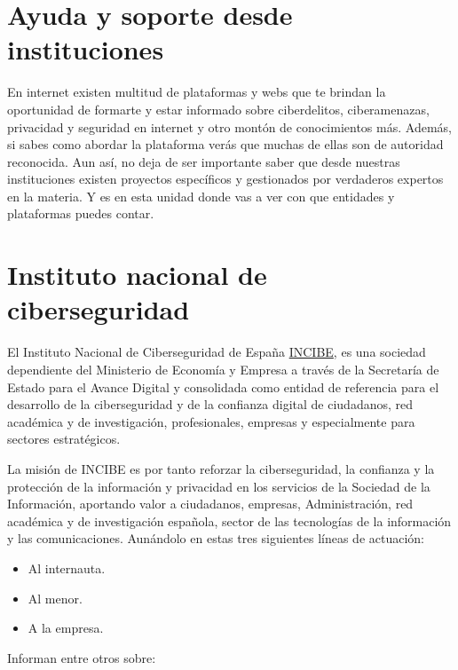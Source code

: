 \documentclass[
  a4paper,
  openany]{book}
\begin{document}
\hypertarget{ayuda-y-soporte-desde-instituciones}{%
\section{Ayuda y soporte desde instituciones}\label{ayuda-y-soporte-desde-instituciones}}

En internet existen multitud de plataformas y webs que te brindan la oportunidad de formarte y estar informado sobre ciberdelitos, ciberamenazas, privacidad y seguridad en internet y otro montón de conocimientos más. Además, si sabes como abordar la plataforma verás que muchas de ellas son de autoridad reconocida. Aun así, no deja de ser importante saber que desde nuestras instituciones existen proyectos específicos y gestionados por verdaderos expertos en la materia. Y es en esta unidad donde vas a ver con que entidades y plataformas puedes contar.

\hypertarget{instituto-nacional-de-ciberseguridad}{%
\section{Instituto nacional de ciberseguridad}\label{instituto-nacional-de-ciberseguridad}}

El Instituto Nacional de Ciberseguridad de España \href{https://www.incibe.es/}{INCIBE}, es una sociedad dependiente del Ministerio de Economía y Empresa a través de la Secretaría de Estado para el Avance Digital y consolidada como entidad de referencia para el desarrollo de la ciberseguridad y de la confianza digital de ciudadanos, red académica y de investigación, profesionales, empresas y especialmente para sectores estratégicos.

La misión de INCIBE es por tanto reforzar la ciberseguridad, la confianza y la protección de la información y privacidad en los servicios de la Sociedad de la Información, aportando valor a ciudadanos, empresas, Administración, red académica y de investigación española, sector de las tecnologías de la información y las comunicaciones. Aunándolo en estas tres siguientes líneas de actuación:

\begin{itemize}
\item
  Al internauta.
\item
  Al menor.
\item
  A la empresa.
\end{itemize}

Informan entre otros sobre:
\end{document}

